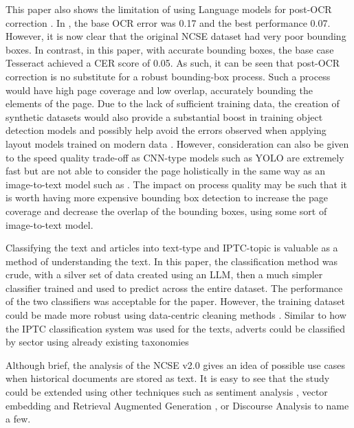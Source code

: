 \documentclass{article} %
\begin{document}
This paper also shows the limitation of using Language models for post-OCR correction \cite{soper_bart_2021, boros_post-correction_2024, thomas_leveraging_2024, bourne_clocr-c_2024, bourne_scrambled_2024-1, kanerva_ocr_2025}. In \textcite{bourne_clocr-c_2024}, the base OCR error was 0.17 and the best performance 0.07. However, it is now clear that the original NCSE dataset had very poor bounding boxes. In contrast, in this paper, with accurate bounding boxes, the base case Tesseract achieved a CER score of 0.05. As such, it can be seen that post-OCR correction is no substitute for a robust bounding-box process. Such a process would have high page coverage and low overlap, accurately bounding the elements of the page. Due to the lack of sufficient training data, the creation of synthetic datasets would also provide a substantial boost in training object detection models and possibly help avoid the errors observed when applying layout models trained on modern data \cite{zhao_doclayout-yolo_2024, auer_docling_2024}. However, consideration can also be given to the speed quality trade-off as CNN-type models such as YOLO are extremely fast but are not able to consider the page holistically in the same way as an image-to-text model such as \cite{faysse_colpali_2024}. The impact on process quality may be such that it is worth having more expensive bounding box detection to increase the page coverage and decrease the overlap of the bounding boxes, using some sort of image-to-text model.

Classifying the text and articles into text-type and IPTC-topic is valuable as a method of understanding the text. In this paper, the classification method was crude, with a silver set of data created using an LLM, then a much simpler classifier trained and used to predict across the entire dataset. The performance of the two classifiers was acceptable for the paper. However, the training dataset could be made more robust using data-centric cleaning methods \cite{northcutt_pervasive_2021}. Similar to how the IPTC classification system was used for the texts, adverts could be classified by sector using already existing taxonomies \cite{iab_interactiveadvertisingbureautaxonomies_2025}

Although brief, the analysis of the NCSE v2.0 gives an idea of possible use cases when historical documents are stored as text. It is easy to see that the study could be extended using other techniques such as sentiment analysis \cite{medhat_sentiment_2014, wankhade_survey_2022,}, vector embedding \cite{pilehvar_embeddings_2020, smits_fully-searchable_2025} and Retrieval Augmented Generation  \cite{lewis_retrieval-augmented_2020, hogan_large_2025}, or Discourse Analysis \cite{atkinson_qualitative_2000} to name a few. 
\end{document}
